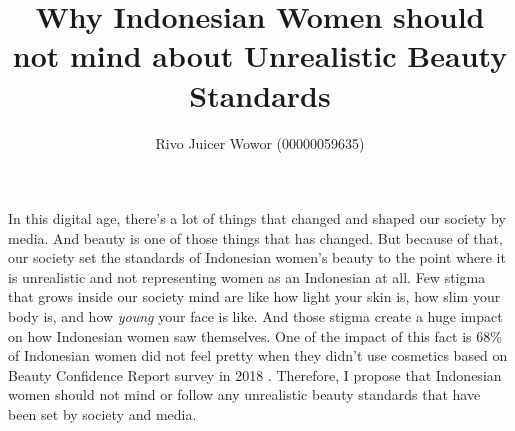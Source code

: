 \documentclass[12pt]{article}
\begin{document}
    \title{Why Indonesian Women should not mind about Unrealistic Beauty Standards}
    \author{Rivo Juicer Wowor (00000059635)}
    \date{}
    \maketitle
    \begin{refsection}
        In this digital age, there's a lot of things that changed and shaped our
        society by media. And beauty is one of those things that has changed. But
        because of that, our society set the standards of Indonesian women's beauty
        to the point where it is unrealistic and not representing women as an
        Indonesian at all. Few stigma that grows inside our society mind are like
        how light your skin is, how slim your body is, and how \emph{young} your
        face is like. And those stigma create a huge impact on how Indonesian women
        saw themselves. One of the impact of this fact is 68\% of Indonesian women
    did not feel pretty when they didn't use cosmetics based on Beauty Confidence
    Report survey in 2018 \parencite{maleSurvei84Persen}.
    Therefore, I propose that Indonesian women should not mind or follow any
    unrealistic beauty standards that have been set by society and media.


\end{refsection}
\end{document}
